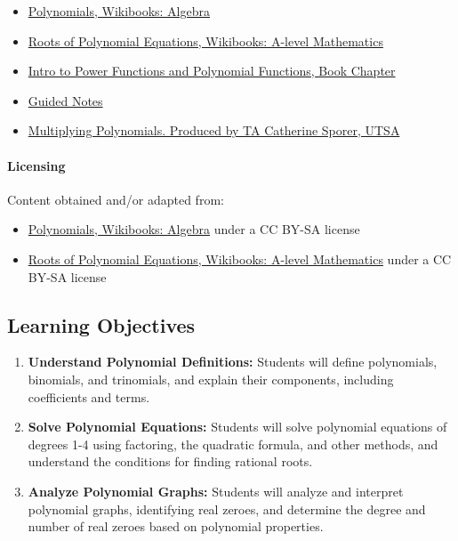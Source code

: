 \begin{itemize}
    \item \href{https://en.wikibooks.org/wiki/Algebra/Polynomials}{Polynomials, Wikibooks: Algebra}
    \item \href{https://en.wikibooks.org/wiki/A-level_Mathematics/OCR/FP1/Roots_of_Polynomial_Equations}{Roots of Polynomial Equations, Wikibooks: A-level Mathematics}
    \item \href{https://mathresearch.utsa.edu/wikiFiles/MAT1053/Intro_to_Polynomial_and_Power_Functions/MAT1053_M2.1Intro_to_Power_Functions_and_Polynomial_Functions.pdf}{Intro to Power Functions and Polynomial Functions, Book Chapter}
    \item \href{https://mathresearch.utsa.edu/wikiFiles/MAT1053/Intro_to_Polynomial_and_Power_Functions/MAT1053_M2.1Intro_to_Power_Functions_and_Polynomial_FunctionsGN.pdf}{Guided Notes}
    \item \href{https://www.youtube.com/watch?v=nJLzFBsSX3o}{Multiplying Polynomials. Produced by TA Catherine Sporer, UTSA}
\end{itemize}

\paragraph{Licensing}



Content obtained and/or adapted from:



\begin{itemize}
    \item \href{https://en.wikibooks.org/wiki/Algebra/Polynomials}{Polynomials, Wikibooks: Algebra} under a CC BY-SA license
    \item \href{https://en.wikibooks.org/wiki/A-level_Mathematics/OCR/FP1/Roots_of_Polynomial_Equations}{Roots of Polynomial Equations, Wikibooks: A-level Mathematics} under a CC BY-SA license
\end{itemize}

\subsection{Learning Objectives}

\begin{enumerate}
    \item \textbf{Understand Polynomial Definitions:} Students will define polynomials, binomials, and trinomials, and explain their components, including coefficients and terms.
    \item \textbf{Solve Polynomial Equations:} Students will solve polynomial equations of degrees 1-4 using factoring, the quadratic formula, and other methods, and understand the conditions for finding rational roots.
    \item \textbf{Analyze Polynomial Graphs:} Students will analyze and interpret polynomial graphs, identifying real zeroes, and determine the degree and number of real zeroes based on polynomial properties.
\end{enumerate}

